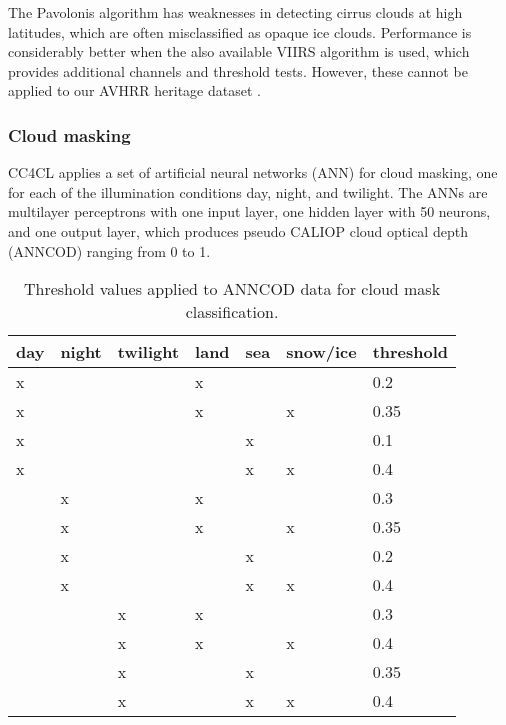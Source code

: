 The Pavolonis algorithm has weaknesses in detecting cirrus clouds at high latitudes, which are often misclassified as opaque ice clouds. Performance is considerably better when the also available VIIRS algorithm is used, which provides additional channels and threshold tests. However, these cannot be applied to our AVHRR heritage dataset \citep{Pavolonis05}.

\subsubsection{Cloud masking}\label{sec:CloudMask}

CC4CL applies a set of artificial neural networks (ANN) for cloud masking, one for each of the illumination conditions day, night, and twilight. The ANNs are multilayer perceptrons with one input layer, one hidden layer with 50 neurons, and one output layer, which produces pseudo CALIOP cloud optical depth (ANNCOD) ranging from 0 to 1. 

\begin{table}[h]
  \caption{Threshold values applied to ANNCOD data for cloud mask classification.}
  \begin{tabular}{llllll|l} %
    \hline
    day & night & twilight & land & sea & snow/ice & threshold \\
    \hline
    x   &       &          & x    &     &          & 0.2  \\
    x   &       &          & x    &     & x        & 0.35 \\
    x   &       &          &      & x   &          & 0.1  \\
    x   &       &          &      & x   & x        & 0.4  \\ \hline
        & x     &          & x    &     &          & 0.3  \\
        & x     &          & x    &     & x        & 0.35 \\
        & x     &          &      & x   &          & 0.2  \\
        & x     &          &      & x   & x        & 0.4  \\ \hline
        &       & x        & x    &     &          & 0.3  \\
        &       & x        & x    &     & x        & 0.4  \\
        &       & x        &      & x   &          & 0.35 \\
        &       & x        &      & x   & x        & 0.4  \\ \hline
  \end{tabular}
  \label{tab:ANN_thresholds}
\end{table}


